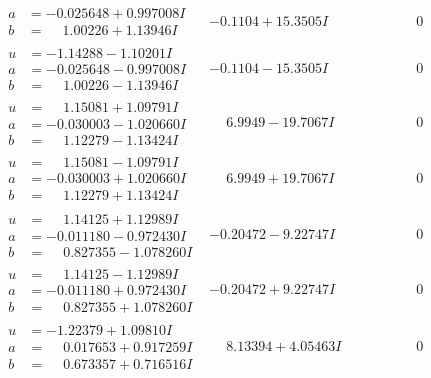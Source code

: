 \documentclass[1p]{elsarticle_modified}
\theoremstyle{definition}
\begin{document}
$$\begin{array}{c|c|c}
\begin{aligned}
a &= -0.025648 + 0.997008 I \\
b &= \phantom{-}1.00226 + 1.13946 I\end{aligned}
 & -0.1104 + 15.3505 I & \phantom{-0.000000 } 0 \\ \hline\begin{aligned}
u &= -1.14288 - 1.10201 I \\
a &= -0.025648 - 0.997008 I \\
b &= \phantom{-}1.00226 - 1.13946 I\end{aligned}
 & -0.1104 - 15.3505 I & \phantom{-0.000000 } 0 \\ \hline\begin{aligned}
u &= \phantom{-}1.15081 + 1.09791 I \\
a &= -0.030003 - 1.020660 I \\
b &= \phantom{-}1.12279 - 1.13424 I\end{aligned}
 & \phantom{-}6.9949 - 19.7067 I & \phantom{-0.000000 } 0 \\ \hline\begin{aligned}
u &= \phantom{-}1.15081 - 1.09791 I \\
a &= -0.030003 + 1.020660 I \\
b &= \phantom{-}1.12279 + 1.13424 I\end{aligned}
 & \phantom{-}6.9949 + 19.7067 I & \phantom{-0.000000 } 0 \\ \hline\begin{aligned}
u &= \phantom{-}1.14125 + 1.12989 I \\
a &= -0.011180 - 0.972430 I \\
b &= \phantom{-}0.827355 - 1.078260 I\end{aligned}
 & -0.20472 - 9.22747 I & \phantom{-0.000000 } 0 \\ \hline\begin{aligned}
u &= \phantom{-}1.14125 - 1.12989 I \\
a &= -0.011180 + 0.972430 I \\
b &= \phantom{-}0.827355 + 1.078260 I\end{aligned}
 & -0.20472 + 9.22747 I & \phantom{-0.000000 } 0 \\ \hline\begin{aligned}
u &= -1.22379 + 1.09810 I \\
a &= \phantom{-}0.017653 + 0.917259 I \\
b &= \phantom{-}0.673357 + 0.716516 I\end{aligned}
 & \phantom{-}8.13394 + 4.05463 I & \phantom{-0.000000 } 0 \\ \hline\begin{aligned}

\end{aligned}
\end{array}$$
\end{document}

